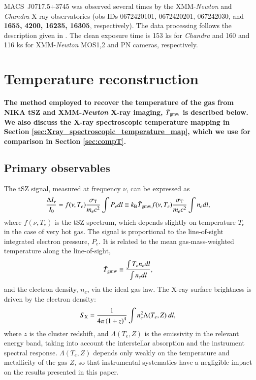 \documentclass[twocolumn,traditabstract]{aa}
\begin{document}
\mbox{MACS~J0717.5+3745} was observed several times by the XMM-\textit{Newton} and \textit{Chandra} X-ray observatories (obs-IDs 0672420101, 0672420201, 067242030, and {\bf 1655, 4200, 16235, 16305}, respectively). The data processing follows the description given in \cite{Adam2016b}. The clean exposure time is 153 ks for \textit{Chandra} and 160 and 116 ks for XMM-\textit{Newton} MOS1,2 and PN cameras, respectively.

\section{Temperature reconstruction}\label{sec:method}
{\bf The method employed to recover the temperature of the gas from NIKA tSZ and XMM-\textit{Newton} X-ray imaging, $\bar{T}_{\rm gmw}$ is described below. We also discuss the X-ray spectroscopic temperature mapping in Section \ref{sec:Xray_spectroscopic_temperature_map}, which we use for comparison in Section \ref{sec:compT}.}

\subsection{Primary observables}
The tSZ signal, measured at frequency $\nu$, can be expressed as
\begin{equation}
	\frac{\Delta I_{\nu}}{I_0} =  f(\nu, T_e) \frac{\sigma_{\rm T}}{m_e c^2} \int P_e dl \equiv k_{\rm B} \bar{T}_{\rm gmw} f(\nu, T_e) \frac{\sigma_{\rm T}}{m_e c^2} \int n_e dl,
\label{eq:dIsz}
\end{equation}
where $f(\nu, T_e)$ is the tSZ spectrum, which depends slightly on temperature $T_e$ in the case of very hot gas. The signal is proportional to the line-of-sight integrated electron pressure, $P_{e}$. It is related to the mean gas-mass-weighted temperature along the line-of-sight, 
\begin{equation}
        \bar{T}_{\rm gmw} \equiv \frac{\int T_e n_e dl}{\int n_e dl},
        \label{eq:Tgmw_def}
\end{equation}
and the electron density, $n_e$, via the ideal gas law. The X-ray surface brightness is driven by the electron density:
\begin{equation}
        S_{\rm X}= \frac{1}{4 \pi \left(1+z\right)^4} \int n_e^2 \Lambda(T_e, Z) \ dl,
        \label{eq:sx}
\end{equation}
where  $z$ is the cluster redshift, and $\Lambda(T_e, Z)$ is the emissivity in the relevant energy band, taking into account the interstellar absorption and the instrument spectral response. $\Lambda(T_e, Z)$ depends only weakly on the temperature and metallicity of the gas $Z$, so that instrumental systematics have a negligible impact on the results presented in this paper.
\end{document}

